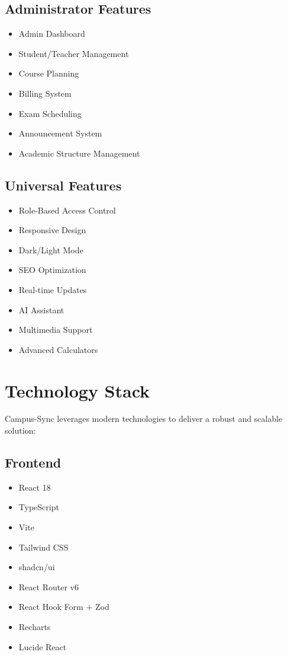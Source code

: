 \subsection{Administrator Features}
\begin{itemize}
    \item Admin Dashboard
    \item Student/Teacher Management
    \item Course Planning
    \item Billing System
    \item Exam Scheduling
    \item Announcement System
    \item Academic Structure Management
\end{itemize}

\subsection{Universal Features}
\begin{itemize}
    \item Role-Based Access Control
    \item Responsive Design
    \item Dark/Light Mode
    \item SEO Optimization
    \item Real-time Updates
    \item AI Assistant
    \item Multimedia Support
    \item Advanced Calculators
\end{itemize}

\section{Technology Stack}

Campus-Sync leverages modern technologies to deliver a robust and scalable solution:

\subsection{Frontend}
\begin{itemize}
    \item React 18
    \item TypeScript
    \item Vite
    \item Tailwind CSS
    \item shadcn/ui
    \item React Router v6
    \item React Hook Form + Zod
    \item Recharts
    \item Lucide React
\end{itemize}

